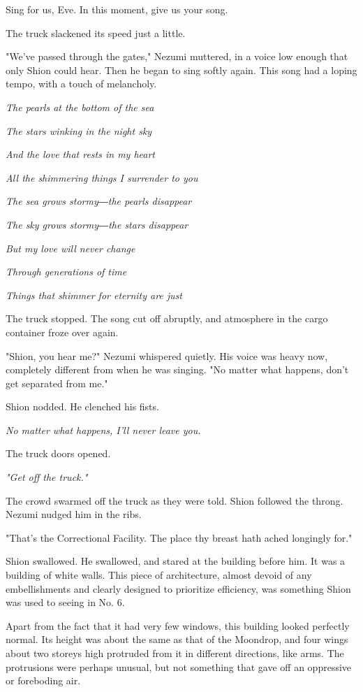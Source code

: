 Sing for us, Eve. In this moment, give us your song.

The truck slackened its speed just a little.

"We've passed through the gates," Nezumi muttered, in a voice low enough
that only Shion could hear. Then he began to sing softly again. This
song had a loping tempo, with a touch of melancholy.

\emph{The pearls at the bottom of the sea}

\emph{The stars winking in the night sky}

\emph{And the love that rests in my heart}

\emph{All the shimmering things I surrender to you}

\emph{The sea grows stormy―the pearls disappear}

\emph{The sky grows stormy―the stars disappear}

\emph{But my love will never change}

\emph{Through generations of time}

\emph{Things that shimmer for eternity are just}

The truck stopped. The song cut off abruptly, and atmosphere in the
cargo container froze over again.

"Shion, you hear me?" Nezumi whispered quietly. His voice was heavy now,
completely different from when he was singing. "No matter what happens,
don't get separated from me."

Shion nodded. He clenched his fists.

\emph{No matter what happens, I'll never leave you.}

The truck doors opened.

\emph{"Get off the truck."}

The crowd swarmed off the truck as they were told. Shion followed the
throng. Nezumi nudged him in the ribs.

"That's the Correctional Facility. The place thy breast hath ached
longingly for."

Shion swallowed. He swallowed, and stared at the building before him. It
was a building of white walls. This piece of architecture, almost devoid
of any embellishments and clearly designed to prioritize efficiency, was
something Shion was used to seeing in No. 6.

Apart from the fact that it had very few windows, this building looked
perfectly normal. Its height was about the same as that of the Moondrop,
and four wings about two storeys high protruded from it in different
directions, like arms. The protrusions were perhaps unusual, but not
something that gave off an oppressive or foreboding air.

